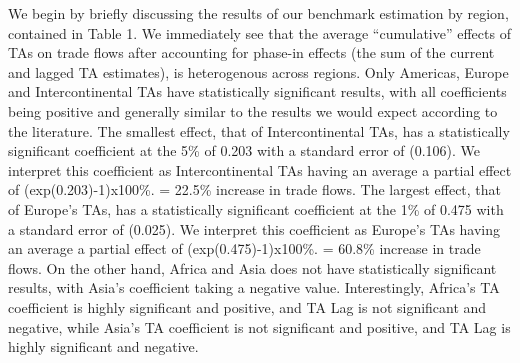 We begin by briefly discussing the results of our benchmark estimation
by region, contained in Table 1. We immediately see that the average
``cumulative'' effects of TAs on trade flows after accounting for
phase-in effects (the sum of the current and lagged TA estimates), is
heterogenous across regions. Only Americas, Europe and Intercontinental
TAs have statistically significant results, with all coefficients being
positive and generally similar to the results we would expect according
to the literature. The smallest effect, that of Intercontinental TAs,
has a statistically significant coefficient at the 5\% of 0.203 with a
standard error of (0.106). We interpret this coefficient as
Intercontinental TAs having an average a partial effect of
(exp(0.203)-1)x100\%. = 22.5\% increase in trade flows. The largest
effect, that of Europe's TAs, has a statistically significant
coefficient at the 1\% of 0.475 with a standard error of (0.025). We
interpret this coefficient as Europe's TAs having an average a partial
effect of (exp(0.475)-1)x100\%. = 60.8\% increase in trade flows. On the
other hand, Africa and Asia does not have statistically significant
results, with Asia's coefficient taking a negative value. Interestingly,
Africa's TA coefficient is highly significant and positive, and TA Lag
is not significant and negative, while Asia's TA coefficient is not
significant and positive, and TA Lag is highly significant and negative.
